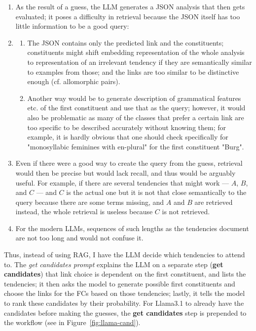 \documentclass[11pt]{article}
\begin{document}
\begin{enumerate}

	\item As the result of a guess, the LLM generates a JSON analysis that then gets evaluated; it poses a difficulty in retrieval because the JSON itself has too little information to be a good query:

	\item \begin{enumerate} 
		
		\item The JSON contains only the predicted link and the constituents; constituents might shift embedding representation of the whole analysis to representation of an irrelevant tendency if they are semantically similar to examples from those; and the links are too similar to be distinctive enough (cf. allomorphic pairs).
		
		\item Another way would be to generate description of grammatical features etc. of the first constituent and use that as the query; however, it would also be problematic as many of the classes that prefer a certain link are too specific to be described accurately without knowing them; for example, it is hardly obvious that one should check specifically for	"monosyllabic feminines with en-plural" for the first constituent "Burg".

    \end{enumerate}
		
	\item Even if there were a good way to create the query from the guess, retrieval would then be precise but would lack recall, and thus would be arguably useful. For example, if there are several tendencies that might work --- $A$, $B$, and $C$ --- and $C$ is the actual one but it is not that close semantically to the query because there are some terms missing, and $A$ and $B$ are retrieved instead, the whole retrieval is useless because $C$ is not retrieved.
	
	\item For the modern LLMs, sequences of such lengths as the tendencies document are not too long and would not confuse it.

\end{enumerate}

Thus, instead of using RAG, I have the LLM decide which tendencies to attend to. The \textit{get candidates prompt} explains the LLM on a separate step (\textbf{get candidates}) that link choice is dependent on the first constituent, and lists the tendencies; it then asks the model to generate possible first constituents and choose the links for the FCs based on those tendencies; lastly, it tells the model to rank these candidates by their probability. For Llama3.1 to already have the candidates before making the guesses, the \textbf{get candidates} step is prepended to the workflow (see in Figure~\ref{fig:llama-cand}).
\end{document}
